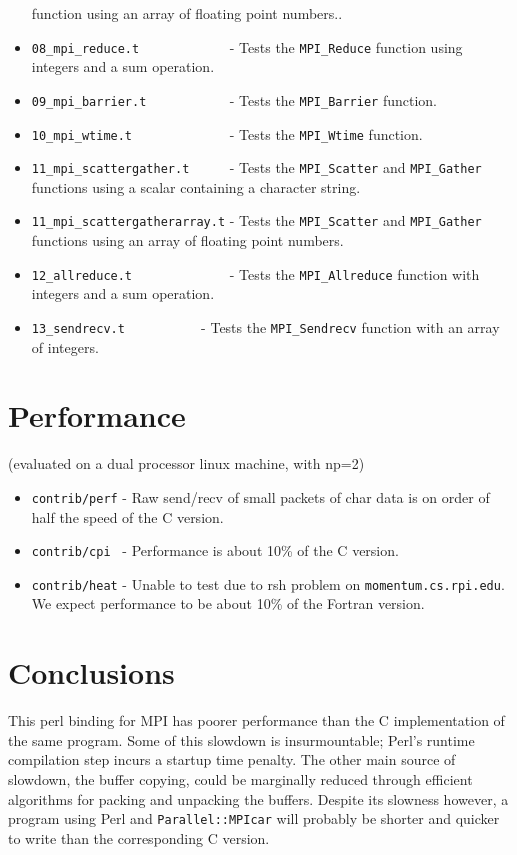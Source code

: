 \documentclass{report}
\begin{document}
\begin{itemize}
function using an array of floating point numbers..
	\item \verb|08_mpi_reduce.t            | - Tests the \verb|MPI_Reduce|
function using integers and a sum operation.
	\item \verb|09_mpi_barrier.t           | - Tests the
\verb|MPI_Barrier| function.
	\item \verb|10_mpi_wtime.t             | - Tests the
\verb|MPI_Wtime| function.
	\item \verb|11_mpi_scattergather.t     | - Tests the
\verb|MPI_Scatter| and \verb|MPI_Gather| functions using a scalar
containing a character string.
	\item \verb|11_mpi_scattergatherarray.t| - Tests the
\verb|MPI_Scatter| and \verb|MPI_Gather| functions using an array of
floating point numbers.
	\item \verb|12_allreduce.t             | - Tests the
\verb|MPI_Allreduce| function with integers and a sum operation.
	\item \verb|13_sendrecv.t	       | - Tests the
\verb|MPI_Sendrecv| function with an array of integers.
\end{itemize}	

\section*{Performance}

   (evaluated on a dual processor linux machine, with np=2)

\begin{itemize}
   \item \verb|contrib/perf| - Raw send/recv of small packets of char
data is on order of half the speed of the C version. 
   \item \verb|contrib/cpi | - Performance is about 10\% of the C version.
   \item \verb|contrib/heat| - Unable to test due to rsh problem on
\verb|momentum.cs.rpi.edu|.  We expect performance to be about 10\% of
the Fortran version.
   
\end{itemize}


\section*{Conclusions}
	This perl binding for MPI has poorer performance than the C
implementation of the same program.  Some of this slowdown
is insurmountable; Perl's runtime compilation step incurs a startup time
penalty.  The other main source of slowdown, the buffer copying, could 
be marginally reduced through efficient algorithms for packing and
unpacking the buffers.  Despite its slowness however, a program using
Perl and \verb|Parallel::MPIcar| will probably be shorter and quicker to write
than the corresponding C version.
  
\end{document}
